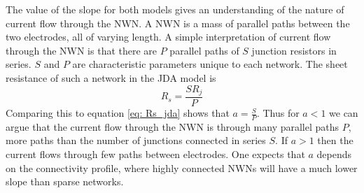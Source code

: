 The value of the slope for both models gives an understanding of the nature of current flow through the NWN. A NWN is a mass of parallel paths between the two electrodes, all of varying length. A simple interpretation of current flow through the NWN is that there are $P$ parallel paths of $S$ junction resistors in series. $S$ and $P$ are characteristic parameters unique to each network. The sheet resistance of such a network in the JDA model is 
\begin{equation}
R_s = \frac{S R_j}{P} 
\end{equation}
Comparing this to equation \ref{eq: Rs_jda} shows that $a = \frac{S}{P}$. Thus for $a<1$ we can argue that the current flow through the NWN is through many parallel paths $P$, more paths than the number of junctions connected in series $S$. If $a>1$ then the current flows through few paths between electrodes. One expects that $a$ depends on the connectivity profile, where highly connected NWNs will have a much lower slope than sparse networks.

